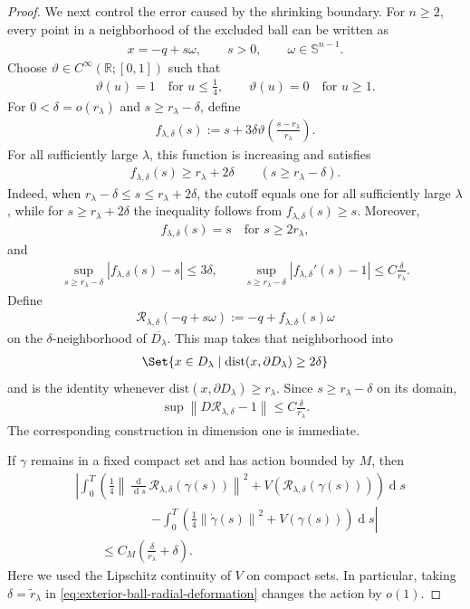 \documentclass[a4paper,10pt]{article}
\numberwithin{equation}{section}
\theoremstyle{plain}
\theoremstyle{plain}
\theoremstyle{plain}
\theoremstyle{plain}
\theoremstyle{plain}
\theoremstyle{remark}
\theoremstyle{definition}
\newcommand{\bS}{\mathbb{S}}
\newcommand{\RR}{\mathbb{R}}
\newcommand\norm[1]{\left\lVert#1\right\rVert}
\newcommand{\dif}{\operatorname{d}\!} %
\newcommand{\dist}{\mathrm{dist}}
\newcommand{\abs}[1]{\left\lvert#1\right\rvert}
\newcommand{\eq}[1]{\begin{align*}#1\end{align*}}
\newcommand{\eql}[1]{\begin{align}#1\end{align}}
\newcommand{\br}[1]{\left(#1\right)}
\begin{document}
\begin{proof}
We next control the error caused by the shrinking boundary. For
$n\geq2$, every point in a neighborhood of the excluded ball can be
written as
\eq{
x=-q+s\omega,
\qquad
s>0,
\qquad
\omega\in\bS^{n-1}.
}
Choose $\vartheta\in C^\infty(\RR;[0,1])$ such that
\eq{
\vartheta(u)=1
\quad
\text{for }
u\leq\frac14,
\qquad
\vartheta(u)=0
\quad
\text{for }
u\geq1.
}
For $0<\delta=o(r_\lambda)$ and
$s\geq r_\lambda-\delta$, define
\eq{
f_{\lambda,\delta}(s)
:=
s
+
3\delta
\vartheta\left(
\frac{s-r_\lambda}{r_\lambda}
\right).
}
For all sufficiently large $\lambda$, this function is increasing and
satisfies
\eq{
f_{\lambda,\delta}(s)
\geq
r_\lambda+2\delta
\qquad
\left(
s\geq r_\lambda-\delta
\right).
}
Indeed, when
$r_\lambda-\delta\leq s\leq r_\lambda+2\delta$, the cutoff equals one
for all sufficiently large $\lambda$, while for
$s\geq r_\lambda+2\delta$ the inequality follows from
$f_{\lambda,\delta}(s)\geq s$. Moreover,
\eq{
f_{\lambda,\delta}(s)
=
s
\quad
\text{for }
s\geq2r_\lambda,
}
and
\eq{
\sup_{s\geq r_\lambda-\delta}
\abs{
f_{\lambda,\delta}(s)-s
}
\leq
3\delta,
\qquad
\sup_{s\geq r_\lambda-\delta}
\abs{
f_{\lambda,\delta}'(s)-1
}
\leq
C\frac{\delta}{r_\lambda}.
}
Define
\eq{
\mathcal R_{\lambda,\delta}
\br{-q+s\omega}
:=
-q+
f_{\lambda,\delta}(s)\omega
}
on the $\delta$-neighborhood of $\overline{D_\lambda}$. This map
takes that neighborhood into
\eq{
\Set{
x\in D_\lambda
\mid
\dist(x,\partial D_\lambda)
\geq2\delta
}
}
and is the identity whenever
$\dist(x,\partial D_\lambda)\geq r_\lambda$. Since
$s\geq r_\lambda-\delta$ on its domain,
\eq{
\sup
\norm{
D\mathcal R_{\lambda,\delta}-1
}
\leq
C\frac{\delta}{r_\lambda}.
}
The corresponding construction in dimension one is immediate.

If $\gamma$ remains in a fixed compact set and has action bounded by
$M$, then
\eql{
&
\left|
\int_0^T
\left(
\frac14
\norm{
\frac{\dif}{\dif{s}}
\mathcal R_{\lambda,\delta}
\br{\gamma(s)}
}^2
+
V\br{
\mathcal R_{\lambda,\delta}
\br{\gamma(s)}
}
\right)
\dif{s}
\right.
\nonumber\\
&\hspace{6em}\left.
-
\int_0^T
\left(
\frac14
\norm{\dot\gamma(s)}^2
+
V\br{\gamma(s)}
\right)
\dif{s}
\right|
\nonumber\\
&\qquad\leq
C_M
\left(
\frac{\delta}{r_\lambda}
+
\delta
\right).
\label{eq:exterior-ball-radial-deformation}
}
Here we used the Lipschitz continuity of $V$ on compact sets. In
particular, taking $\delta=\widetilde r_\lambda$ in
\cref{eq:exterior-ball-radial-deformation} changes the action by
$o(1)$.


\end{proof}
\end{document}

